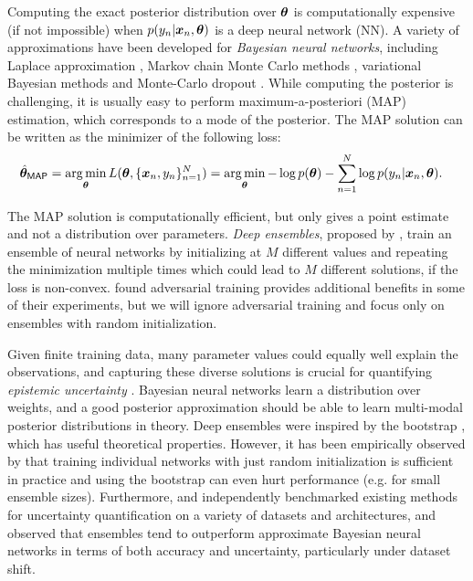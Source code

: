 \documentclass{article}
\newcommand{\data}{\{\vx_n, y_n\}_{n=1}^N}
\newcommand{\map}{\mathsf{MAP}}
\begin{document}
Computing the exact posterior distribution over ${\bm{\theta}}$ is  computationally expensive (if not impossible) when $p(y_n | {\bm{x}}_n, {\bm{\theta}})$ is a deep neural network (NN). A variety of approximations have been developed for \emph{Bayesian neural networks}, including Laplace approximation \citep{mackay1992bayesian},  Markov chain Monte Carlo methods \citep{Neal96,Welling2011,springenberg2016bayesian}, variational Bayesian methods \citep{graves,BBB,louizos2017multiplicative,flipout} and Monte-Carlo dropout \citep{mcdropout,dropout}.  %
%
While computing the posterior is challenging, it is usually easy to perform maximum-a-posteriori (MAP) estimation, which corresponds to a mode of the posterior. The MAP solution can be written as the minimizer of the following loss: 
\vspace{-1em} 
\begin{align}
     \hat{\vtheta}_\map &= \argmin_\vtheta L(\vtheta, \data) %
    = \argmin_\vtheta
    -\log p(\vtheta) - \sum_{n=1}^N \log p(y_n | \vx_n, \vtheta). \label{eqn:loss} 
\end{align}
%

%
%
%
%
%
The MAP solution is computationally efficient, but only gives a point estimate and not a distribution over parameters. 
\emph{Deep ensembles}, proposed by \citet{lakshminarayanan2017simple}, train an ensemble of neural networks by initializing at $M$ different values and repeating the minimization multiple times %
which could lead to $M$ different solutions, if the loss is non-convex. 
\citet{lakshminarayanan2017simple} found adversarial training provides additional benefits in some of their experiments, but we will ignore adversarial training  and focus only on ensembles with random initialization. %

Given finite training data, many parameter values could equally well explain the observations, and capturing these diverse solutions is crucial for quantifying \emph{epistemic uncertainty} \citep{kendall2017uncertainties}. 
Bayesian neural networks learn a distribution over weights, and a good posterior approximation should be able to learn multi-modal posterior distributions in theory.  
%
Deep ensembles were inspired by the bootstrap \citep{bagging}, which has useful theoretical properties. However, it has been empirically observed by \citet{lakshminarayanan2017simple,mheads} that training individual networks with just random initialization is sufficient in practice and using the bootstrap can even hurt  performance (e.g. for small ensemble sizes). 
%
Furthermore, 
 \citet{ovadia2019can} and \citet{gustafsson2019evaluating} independently benchmarked existing methods for uncertainty quantification on a variety of datasets and architectures, and observed that ensembles tend to outperform  approximate Bayesian neural networks in terms of both accuracy and uncertainty, particularly under dataset shift. 
\end{document}
